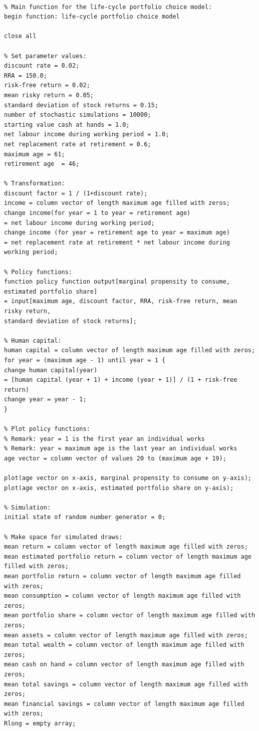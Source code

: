 \documentclass[a4paper,9pt, parskip=half-]{scrartcl}
\begin{document}
\begin{lstlisting}[frame=single]

% Main function for the life-cycle portfolio choice model:
begin function: life-cycle portfolio choice model

close all
 
% Set parameter values: 
discount rate = 0.02;
RRA = 150.0;
risk-free return = 0.02;          
mean risky return = 0.05;          
standard deviation of stock returns = 0.15;         
number of stochastic simulations = 10000;          
starting value cash at hands = 1.0;
net labour income during working period = 1.0;        
net replacement rate at retirement = 0.6;         
maximum age = 61;         
retirement age  = 46;          
 
% Transformation:
discount factor = 1 / (1+discount rate);
income = column vector of length maximum age filled with zeros;
change income(for year = 1 to year = retirement age) 
= net labour income during working period;
change income (for year = retirement age to year = maximum age) 
= net replacement rate at retirement * net labour income during working period;

% Policy functions:
function policy function output[marginal propensity to consume, estimated portfolio share] 
= input[maximum age, discount factor, RRA, risk-free return, mean risky return, 
standard deviation of stock returns];

% Human capital:
human capital = column vector of length maximum age filled with zeros;
for year = (maximum age - 1) until year = 1 {
change human capital(year) 
= [human capital (year + 1) + income (year + 1)] / (1 + risk-free return)
change year = year - 1;
}

% Plot policy functions:
% Remark: year = 1 is the first year an individual works
% Remark: year = maximum age is the last year an individual works
age vector = column vector of values 20 to (maximum age + 19);

plot(age vector on x-axis, marginal propensity to consume on y-axis);
plot(age vector on x-axis, estimated portfolio share on y-axis);

% Simulation:
initial state of random number generator = 0;

% Make space for simulated draws:
mean return = column vector of length maximum age filled with zeros;
mean estimated portfolio return = column vector of length maximum age filled with zeros;
mean portfolio return = column vector of length maximum age filled with zeros;
mean consumption = column vector of length maximum age filled with zeros;
mean portfolio share = column vector of length maximum age filled with zeros;
mean assets = column vector of length maximum age filled with zeros;
mean total wealth = column vector of length maximum age filled with zeros;
mean cash on hand = column vector of length maximum age filled with zeros;
mean total savings = column vector of length maximum age filled with zeros;
mean financial savings = column vector of length maximum age filled with zeros;
Rlong = empty array;



\end{lstlisting}
\end{document}
